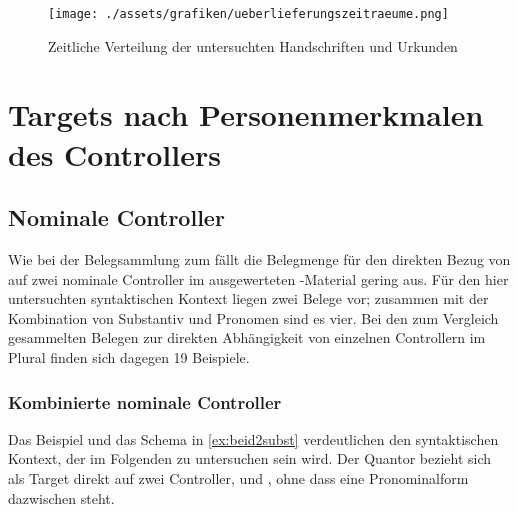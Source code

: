 \begin{figure}[p]
\centering
\texttt{[image: ./assets/grafiken/ueberlieferungszeitraeume.png]}
\caption{Zeitliche Verteilung der untersuchten Handschriften und Urkunden}
\label{fig:zeitstrahl}
\end{figure}

\section{Targets nach Personenmerkmalen des Controllers}
\label{sec:kctargpers}

\subsection{Nominale Controller}

Wie bei der Belegsammlung zum \CAO{} fällt die Belegmenge für den
direkten Bezug von  auf zwei nominale Controller im ausgewerteten
\KC{}-Material gering aus. Für den hier untersuchten syntaktischen Kontext
liegen zwei Belege vor; zusammen mit der Kombination von Substantiv und
Pronomen sind es vier. Bei den zum Vergleich gesammelten Belegen zur direkten
Abhängigkeit von einzelnen Controllern im Plural finden sich dagegen 19
Beispiele.

\subsubsection{Kombinierte nominale Controller}
\label{subsubsec:conomctrlpers}

Das Beispiel und das Schema in \cref{ex:beid2subst} verdeutlichen den
syntaktischen Kontext, der im Folgenden zu untersuchen sein wird. Der Quantor
 bezieht sich als Target direkt auf zwei Controller,
 und , ohne dass eine Pronominalform dazwischen
steht.

